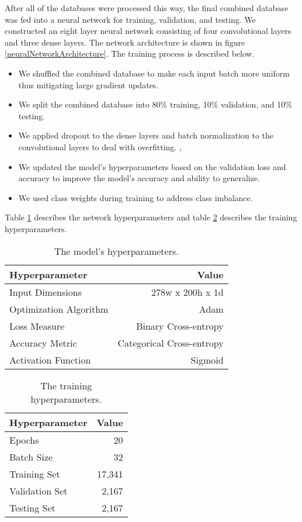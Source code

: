 After all of the databases were processed this way, the final combined database was fed into a neural network for training, validation, and testing. We constructed an eight layer neural network consisting of four convolutional layers and three dense layers. The network architecture is shown in figure \ref{neuralNetworkArchitecture}. The training process is described below.
\begin{itemize}
	\item We shuffled the combined database to make each input batch more uniform thus mitigating large gradient updates.
	\item We split the combined database into 80\% training, 10\% validation, and 10\% testing.
	\item We applied dropout to the dense layers and batch normalization to the convolutional layers to deal with overfitting. \cite{Srivastava2014}, \cite{Ioffe2015}
	\item We updated the model's hyperparameters based on the validation loss and accuracy to improve the model's accuracy and ability to generalize.
	\item We used class weights during training to address class imbalance.
\end{itemize}

Table \ref{modelHyperparams} describes the network hyperparameters and table \ref{trainHyperparams} describes the training hyperparameters.

\begin{table}
	\centering
	\caption{The model's hyperparameters.}
	\label{modelHyperparams}
	\begin{tabular}{@{}lr@{}}
		\toprule
		Hyperparameter & Value \\
		\midrule
		Input Dimensions & 278w x 200h x 1d \\
		Optimization Algorithm & Adam \\
		Loss Measure & Binary Cross-entropy \\
		Accuracy Metric & Categorical Cross-entropy \\
		Activation Function & Sigmoid \\
		\bottomrule
	\end{tabular}
\end{table}

\begin{table}
	\centering
	\caption{The training hyperparameters.}
	\label{trainHyperparams}
	\begin{tabular}{@{}lr@{}}
		\toprule
		Hyperparameter & Value \\
		\midrule
		Epochs & 20 \\
		Batch Size & 32 \\
		Training Set & 17,341 \\
		Validation Set & 2,167 \\
		Testing Set & 2,167 \\
		\bottomrule
	\end{tabular}
\end{table}

